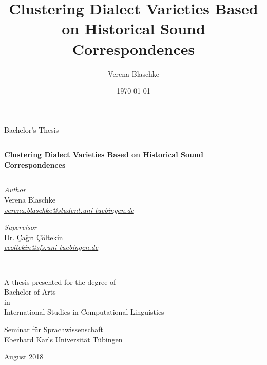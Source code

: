 \documentclass[a4paper]{article}
\title{Clustering Dialect Varieties Based on Historical Sound Correspondences}
\author{Verena Blaschke}
\date{\today}
\begin{document}
\begin{titlepage}
\begin{center}

\vspace*{.1\textheight}

{\Large Bachelor's Thesis}
\vspace{2em}

\hrule
\vspace{0.6cm}
{\huge\bfseries
Clustering Dialect Varieties Based on Historical Sound Correspondences
}\\[0.7cm] 
\hrule
\vspace*{.05\textheight}
 
\begin{minipage}[t]{0.4\textwidth}
\begin{flushleft} 
{\large
\textit{Author}\\
Verena Blaschke}\\
\href{mailto:verena.blaschke@student.uni-tuebingen.de}{\textit{verena.blaschke@student.uni-tuebingen.de}}\\
\end{flushleft}
\end{minipage}
\begin{minipage}[t]{0.4\textwidth}
\begin{flushright}
{\large
\textit{Supervisor}\\
Dr. Çağrı Çöltekin}\\
\href{mailto:ccoltekin@sfs.uni-tuebingen.de}{\textit{ccoltekin@sfs.uni-tuebingen.de}}\\
\end{flushright}
\end{minipage}\\

\vspace*{.1\textheight}

A thesis presented for the degree of\\
Bachelor of Arts\\
in\\
International Studies in Computational Linguistics

\vspace{2em}

Seminar für Sprachwissenschaft\\
Eberhard Karls Universität Tübingen

\vspace*{.1\textheight}
August 2018
\end{center}
  
\end{titlepage}
\end{document}
